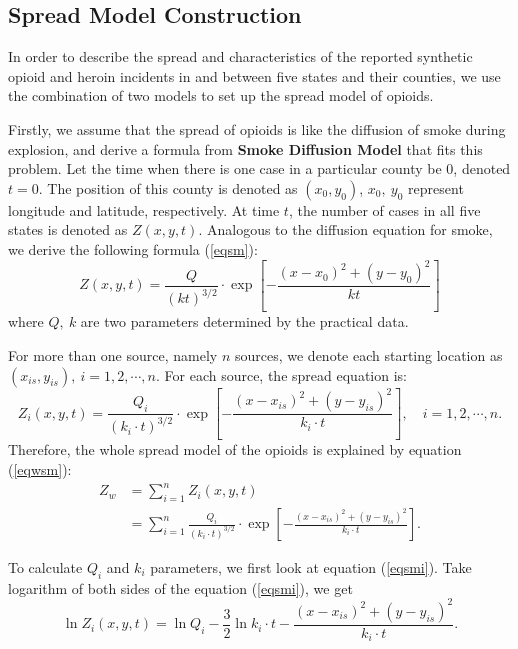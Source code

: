 \documentclass{mcmthesis}
\numberwithin{equation}{section}
\numberwithin{figure}{section}
\numberwithin{table}{section}
\theoremstyle{mydef}
\begin{document}
\subsection{ Spread Model Construction}

In order to describe the spread and characteristics of the reported synthetic opioid and heroin incidents in and between five states and their counties, we use the combination of two models to set up the spread model of opioids.

Firstly, we assume that the spread of opioids is like the diffusion of smoke during explosion, and derive a formula from {\bf{Smoke Diffusion Model}} that fits this problem\cite{b1}. Let the time when there is one case in a particular county be 0, denoted $t=0$. The position of this county is denoted as $(x_0,y_0)$, $x_0,\ y_0$ represent longitude and latitude, respectively. At time $t$, the number of cases in all five states is denoted as $Z(x,y,t)$. Analogous to the diffusion equation for smoke, we derive the following formula (\ref{eqsm}):
\begin{equation}
Z(x,y,t) = \frac{Q}{(kt)^{3/2}}\cdot \exp{\left[-\frac{(x-x_0)^2+(y-y_0)^2}{kt}\right]}
\label{eqsm}
\end{equation}
where $Q,\ k$ are two parameters determined by the practical data.

For more than one source, namely $n$ sources, we denote each starting location as $(x_{is},y_{is}), \ i=1,2,\cdots,n.$ For each source, the spread equation is:
\begin{equation}
Z_i(x,y,t) = \frac{Q_i}{(k_i\cdot t)^{3/2}}\cdot \exp{\left[-\frac{(x-x_{is})^2+(y-y_{is})^2}{k_i\cdot t}\right]},\quad i=1,2,\cdots,n.
\label{eqsmi}
\end{equation}
Therefore, the whole spread model of the opioids is explained by equation (\ref{eqwsm}):
\begin{equation}
\begin{aligned}
Z_w&=\sum\limits_{i=1}^n Z_i(x,y,t) \\
&=\sum\limits_{i=1}^n \frac{Q_i}{(k_i\cdot t)^{3/2}}\cdot \exp{\left[-\frac{(x-x_{is})^2+(y-y_{is})^2}{k_i\cdot t}\right]}.
\label{eqwsm}
\end{aligned}
\end{equation}

To calculate $Q_i$ and $k_i$ parameters, we first look at equation (\ref{eqsmi}). Take logarithm of both sides of the equation (\ref{eqsmi}), we get
\begin{equation}
\ln Z_i(x,y,t) = \ln Q_i - \frac{3}{2}\ln k_i\cdot t-\frac{(x-x_{is})^2+(y-y_{is})^2}{k_i\cdot t}.
\label{eqsmlog}
\end{equation}
\end{document}
